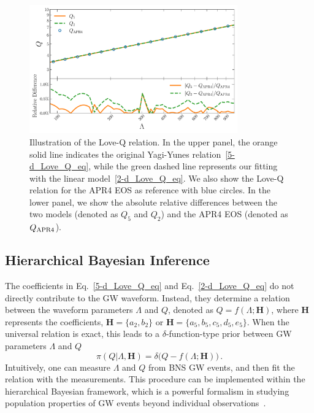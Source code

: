 \documentclass[a4paper,11pt]{article}
\begin{document}
\begin{figure}[tbp]
\centering
\includegraphics[width=0.8\textwidth]{fig_2d-5d_difference.pdf}
\caption{Illustration of the Love-Q relation. In the upper panel, the orange
solid line indicates the original Yagi-Yunes relation~\eqref{5-d_Love_Q_eq},
while the green dashed line represents our fitting with the linear
model~\eqref{2-d_Love_Q_eq}. We also show the Love-Q relation for the APR4 EOS
as reference with blue circles.  In the lower panel, we show the absolute
relative differences between the two models (denoted as $Q_5$ and $Q_2$) and the
APR4 EOS (denoted as $Q_{\rm APR4}$). }
\label{relative_difference}
\end{figure}

\subsection{Hierarchical Bayesian Inference}
\label{subsec:framework_principles}

The coefficients in Eq.~\eqref{5-d_Love_Q_eq} and Eq.~\eqref{2-d_Love_Q_eq} do
not directly contribute to the GW waveform. Instead, they determine a relation
between the waveform parameters $\Lambda$ and $Q$, denoted as
$Q=f(\Lambda;\bm{H})$, where $\bm{H}$ represents the coefficients, $\bm{H} =
\{a_2, b_2\}$ or $\bm{H} = \{a_5, b_5, c_5, d_5, e_5\}$. When the universal
relation is exact, this leads to a $\delta$-function-type prior between GW
parameters $\Lambda$ and $Q$
\begin{equation}
\label{delta function prior}
\pi(Q|\Lambda,\bm{H}) = \delta\big(Q-f(\Lambda;\bm{H})\big)\,.
\end{equation}
Intuitively, one can measure $\Lambda$ and $Q$ from BNS GW events, and then fit
the relation with the measurements. This procedure can be implemented within the
hierarchical Bayesian framework, which is a powerful formalism in studying population
properties of GW events beyond individual observations~\cite{Thrane_2019}. 
\end{document}
